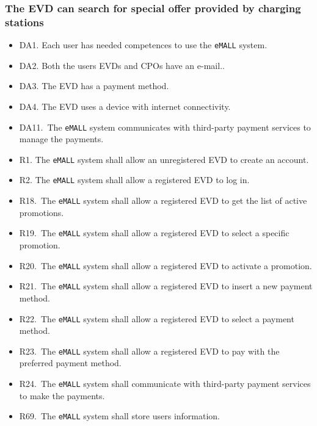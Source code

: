 \subsubsection{The EVD can search for special offer provided by charging stations}
\begin{itemize}
    \item DA1. Each user has needed competences to use the \verb|eMALL| system.
    \item DA2. Both the users EVDs and CPOs have an e-mail..
    \item DA3. The EVD has a payment method.
    \item DA4. The EVD uses a device with internet connectivity.
    \item DA11.\ The \verb|eMALL| system communicates with third-party payment services to manage
    the payments.
    \item R1. The \verb|eMALL| system shall allow an unregistered EVD to create an account.
    \item R2. The \verb|eMALL| system shall allow a registered EVD to log in.
    \item R18.\ The \verb|eMALL| system shall allow a registered EVD to get the list of active promotions.
    \item R19.\ The \verb|eMALL| system shall allow a registered EVD to select a specific promotion.
    \item R20.\ The \verb|eMALL| system shall allow a registered EVD to activate a promotion.
    \item R21.\ The \verb|eMALL| system shall allow a registered EVD to insert a new payment method.
    \item R22.\ The \verb|eMALL| system shall allow a registered EVD to select a payment method.
    \item R23.\ The \verb|eMALL| system shall allow a registered EVD to pay with the preferred payment
    method.
    \item R24.\ The \verb|eMALL| system shall communicate with third-party payment services to make
    the payments.
    \item R69.\ The \verb|eMALL| system shall store users information.
\end{itemize}


